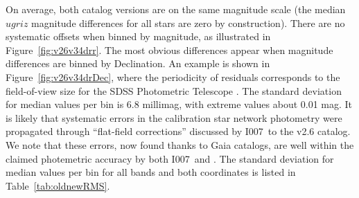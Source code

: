 \documentclass[fleqn,usenatbib]{mnras}
\newcommand{\pO}{\hbox{I007}}
\begin{document}
On average, both catalog versions are on the same magnitude scale (the median $ugriz$ 
magnitude differences for all stars are zero by construction). There are no systematic offsets 
when binned by magnitude, as illustrated in Figure~\ref{fig:v26v34drr}. The most obvious 
differences appear when magnitude differences are binned by Declination. An example is 
shown in Figure~\ref{fig:v26v34drDec}, where the periodicity of residuals corresponds to the 
field-of-view size for the SDSS Photometric Telescope \citep{2006AN....327..821T}. 
The standard deviation for median values per bin is 6.8 millimag, with extreme values about 
0.01 mag. It is likely that systematic errors in the calibration star network photometry 
were propagated through ``flat-field corrections'' discussed by \pO\ to the v2.6 catalog.
We note that these errors, now found thanks to Gaia catalogs, are well within the claimed
photemetric accuracy by both \pO\ and \cite{2002AJ....123.2121S}. The standard deviation 
for median values per bin for all bands and both coordinates is listed in Table~\ref{tab:oldnewRMS}. 


   
\end{document}
